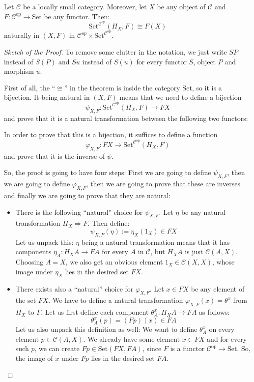 \begin{theorem}[Yoneda, 4.2.1] Let $\mathcal{C}$ be a locally small category. Moreover, let $X$ be any object of $\mathcal{C}$ and $F:\mathcal{C}^{\mathrm{op}}\to\mathrm{Set}$ be any functor. Then:
\[\mathrm{Set}^{\mathcal{C}^{\mathrm{op}}}(H_X,F)\cong F(X)\]
naturally in $(X,F)$ in $\mathcal{C}^{op}\times\mathrm{Set}^{\mathcal{C}^{\mathrm{op}}}$.
\end{theorem}
\begin{proof}[Sketch of the Proof] To remove some clutter in the notation, we just write $SP$ instead of $S(P)$ and $Su$ instead of $S(u)$ for every functor $S$, object $P$ and morphism $u$.

First of all, the ``$\cong$'' in the theorem is inside the category $\mathrm{Set}$, so it is a bijection. It being natural in $(X,F)$ means that we need to define a bijection
\[\psi_{X,F}:\mathrm{Set}^{\mathcal{C}^{\mathrm{op}}}(H_X,F)\to FX\]
and prove that it is a natural transformation between the following two functors:
\begin{center}
\end{center}
In order to prove that this is a bijection, it suffices to define a function
\[\varphi_{X,F}:FX\to\mathrm{Set}^{\mathcal{C}^{\mathrm{op}}}(H_X,F)\]
and prove that it is the inverse of $\psi$.

So, the proof is going to have four steps: First we are going to define $\psi_{X,F}$, then we are going to define $\varphi_{X,F}$, then we are going to prove that these are inverses and finally we are going to prove that they are natural:
\begin{itemize}
\item There is the following ``natural'' choice for $\psi_{X,F}$. Let $\eta$ be any natural transformation $H_X\Rightarrow F$. Then define:
\[\psi_{X,F}(\eta):=\eta_X(1_X)\in FX\]
Let us unpack this: $\eta$ being a natural transformation means that it has components $\eta_A:H_XA\to FA$ for every $A$ in $\mathcal{C}$, but $H_XA$ is just $\mathcal{C}(A,X)$. Choosing $A=X$, we also get an obvious element $1_X\in\mathcal{C}(X,X)$, whose image under $\eta_X$ lies in the desired set $FX$.

\item There exists also a ``natural'' choice for $\varphi_{X,F}$. Let $x\in FX$ be any element of the set $FX$. We have to define a natural transformation $\varphi_{X,F}(x)=\theta^x$ from $H_X$ to $F$. Let us first define each component $\theta^x_A:H_XA\to FA$ as follows:
\[\theta^x_A(p)=(Fp)(x)\in FA\]
Let us also unpack this definition as well: We want to define $\theta^x_A$ on every element $p\in\mathcal{C}(A,X)$. We already have some element $x\in FX$ and for every such $p$, we can create $Fp\in\mathrm{Set}(FX,FA)$, since $F$ is a functor $\mathcal{C}^{\mathrm{op}}\to\mathrm{Set}$. So, the image of $x$ under $Fp$ lies in the desired set $FA$.


\end{itemize}
\end{proof}
